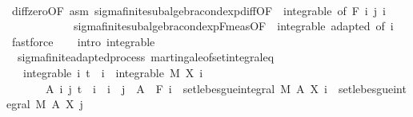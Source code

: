 \begin{isabellebody}
\ \ \ \ \ \ \isamarkupfalse%
\ diff{\isacharunderscore}{\kern0pt}zero{\isacharbrackleft}{\kern0pt}OF\ asm{\isacharbrackright}{\kern0pt}\ sigma{\isacharunderscore}{\kern0pt}finite{\isacharunderscore}{\kern0pt}subalgebra{\isachardot}{\kern0pt}cond{\isacharunderscore}{\kern0pt}exp{\isacharunderscore}{\kern0pt}diff{\isacharbrackleft}{\kern0pt}OF\ {\isacharunderscore}{\kern0pt}\ integrable{\isacharparenleft}{\kern0pt}{}{\isacharcomma}{\kern0pt}{}{\isacharparenright}{\kern0pt}{\isacharcomma}{\kern0pt}\ of\ {\isachardoublequoteopen}F\ i{\isachardoublequoteclose}\ j\ i{\isacharbrackright}{\kern0pt}\ \isanewline
\ \ \ \ \ \ \ \ \ \ \ \ sigma{\isacharunderscore}{\kern0pt}finite{\isacharunderscore}{\kern0pt}subalgebra{\isachardot}{\kern0pt}cond{\isacharunderscore}{\kern0pt}exp{\isacharunderscore}{\kern0pt}F{\isacharunderscore}{\kern0pt}meas{\isacharbrackleft}{\kern0pt}OF\ {\isacharunderscore}{\kern0pt}\ integrable\ adapted{\isacharcomma}{\kern0pt}\ of\ i{\isacharbrackright}{\kern0pt}\ \isamarkupfalse%
\ fastforce\isanewline
\ \ \isacommand{{\isacharbraceright}{\kern0pt}}\isamarkupfalse%
\isanewline
{}\isamarkupfalse%
\ {\isacharparenleft}{\kern0pt}intro\ integrable{\isacharparenright}{\kern0pt}%
\endisatagproof
{\isafoldproof}%
%
\isadelimproof
\isanewline
%
\endisadelimproof
\isanewline
{}\isamarkupfalse%
\ {\isacharparenleft}{\kern0pt}\ sigma{\isacharunderscore}{\kern0pt}finite{\isacharunderscore}{\kern0pt}adapted{\isacharunderscore}{\kern0pt}process{\isacharparenright}{\kern0pt}\ martingale{\isacharunderscore}{\kern0pt}of{\isacharunderscore}{\kern0pt}set{\isacharunderscore}{\kern0pt}integral{\isacharunderscore}{\kern0pt}eq{\isacharcolon}{\kern0pt}\isanewline
\ \ \ integrable{\isacharcolon}{\kern0pt}\ {\isachardoublequoteopen}{\isasymAnd}i{\isachardot}{\kern0pt}\ t\ {\isasymle}\ i\ {\isasymLongrightarrow}\ integrable\ M\ {\isacharparenleft}{\kern0pt}X\ i{\isacharparenright}{\kern0pt}{\isachardoublequoteclose}\isanewline
\ \ \ \ \ \ \ {\isachardoublequoteopen}{\isasymAnd}A\ i\ j{\isachardot}{\kern0pt}\ t\ {\isasymle}\ i\ {\isasymLongrightarrow}\ i\ {\isasymle}\ j\ {\isasymLongrightarrow}\ A\ {\isasymin}\ F\ i\ {\isasymLongrightarrow}\ set{\isacharunderscore}{\kern0pt}lebesgue{\isacharunderscore}{\kern0pt}integral\ M\ A\ {\isacharparenleft}{\kern0pt}X\ i{\isacharparenright}{\kern0pt}\ {\isacharequal}{\kern0pt}\ set{\isacharunderscore}{\kern0pt}lebesgue{\isacharunderscore}{\kern0pt}integral\ M\ A\ {\isacharparenleft}{\kern0pt}X\ j{\isacharparenright}{\kern0pt}{\isachardoublequoteclose}\ \isanewline

\end{isabellebody}
